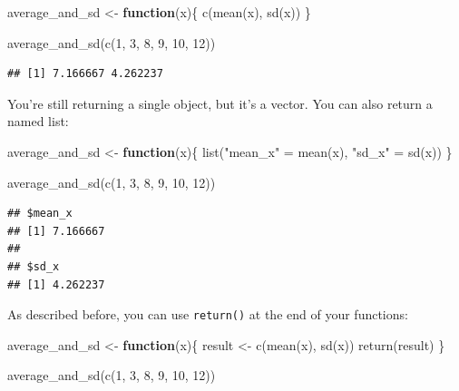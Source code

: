 \documentclass[
]{article}
\newenvironment{Shaded}{\begin{snugshade}}{\end{snugshade}}
\newcommand{\ControlFlowTok}[1]{\textcolor[rgb]{0.13,0.29,0.53}{\textbf{#1}}}
\newcommand{\DecValTok}[1]{\textcolor[rgb]{0.00,0.00,0.81}{#1}}
\newcommand{\FunctionTok}[1]{\textcolor[rgb]{0.00,0.00,0.00}{#1}}
\newcommand{\NormalTok}[1]{#1}
\newcommand{\OtherTok}[1]{\textcolor[rgb]{0.56,0.35,0.01}{#1}}
\newcommand{\StringTok}[1]{\textcolor[rgb]{0.31,0.60,0.02}{#1}}
\begin{document}
\begin{Shaded}
\begin{Highlighting}[]
\NormalTok{average\_and\_sd }\OtherTok{\textless{}{-}} \ControlFlowTok{function}\NormalTok{(x)\{}
\FunctionTok{c}\NormalTok{(}\FunctionTok{mean}\NormalTok{(x), }\FunctionTok{sd}\NormalTok{(x))}
\NormalTok{\}}

\FunctionTok{average\_and\_sd}\NormalTok{(}\FunctionTok{c}\NormalTok{(}\DecValTok{1}\NormalTok{, }\DecValTok{3}\NormalTok{, }\DecValTok{8}\NormalTok{, }\DecValTok{9}\NormalTok{, }\DecValTok{10}\NormalTok{, }\DecValTok{12}\NormalTok{))}
\end{Highlighting}
\end{Shaded}

\begin{verbatim}
## [1] 7.166667 4.262237
\end{verbatim}

You're still returning a single object, but it's a vector. You can also return a named list:

\begin{Shaded}
\begin{Highlighting}[]
\NormalTok{average\_and\_sd }\OtherTok{\textless{}{-}} \ControlFlowTok{function}\NormalTok{(x)\{}
\FunctionTok{list}\NormalTok{(}\StringTok{"mean\_x"} \OtherTok{=}  \FunctionTok{mean}\NormalTok{(x), }\StringTok{"sd\_x"} \OtherTok{=} \FunctionTok{sd}\NormalTok{(x))}
\NormalTok{\}}

\FunctionTok{average\_and\_sd}\NormalTok{(}\FunctionTok{c}\NormalTok{(}\DecValTok{1}\NormalTok{, }\DecValTok{3}\NormalTok{, }\DecValTok{8}\NormalTok{, }\DecValTok{9}\NormalTok{, }\DecValTok{10}\NormalTok{, }\DecValTok{12}\NormalTok{))}
\end{Highlighting}
\end{Shaded}

\begin{verbatim}
## $mean_x
## [1] 7.166667
## 
## $sd_x
## [1] 4.262237
\end{verbatim}

As described before, you can use \texttt{return()} at the end of your functions:

\begin{Shaded}
\begin{Highlighting}[]
\NormalTok{average\_and\_sd }\OtherTok{\textless{}{-}} \ControlFlowTok{function}\NormalTok{(x)\{}
\NormalTok{  result }\OtherTok{\textless{}{-}} \FunctionTok{c}\NormalTok{(}\FunctionTok{mean}\NormalTok{(x), }\FunctionTok{sd}\NormalTok{(x))}
\FunctionTok{return}\NormalTok{(result)}
\NormalTok{\}}

\FunctionTok{average\_and\_sd}\NormalTok{(}\FunctionTok{c}\NormalTok{(}\DecValTok{1}\NormalTok{, }\DecValTok{3}\NormalTok{, }\DecValTok{8}\NormalTok{, }\DecValTok{9}\NormalTok{, }\DecValTok{10}\NormalTok{, }\DecValTok{12}\NormalTok{))}
\end{Highlighting}
\end{Shaded}
\end{document}
